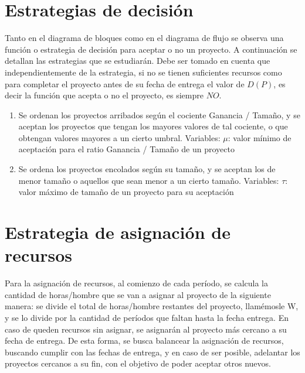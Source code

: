 \section{Estrategias de decisión}

Tanto en el diagrama de bloques como en el diagrama de flujo se observa una función o estrategia de decisión para aceptar o no un proyecto. A continuación se detallan 
las estrategias que se estudiarán. Debe ser tomado en cuenta que independientemente de la estrategia, si no se tienen suficientes recursos como para completar el proyecto 
antes de su fecha de entrega el valor de $D(P)$, es decir la función que acepta o no el proyecto, es siempre $NO$.

\begin{enumerate}
    \item Se ordenan los proyectos arribados según el cociente Ganancia / Tamaño, y se aceptan los proyectos que tengan los mayores valores de tal cociente,
 o que obtengan valores mayores a un cierto umbral.
    Variables: $\mu$: valor mínimo de aceptación para el ratio Ganancia / Tamaño de un proyecto

    \item Se ordena los proyectos encolados según su tamaño, y se aceptan los de menor tamaño o aquellos que sean menor a un cierto tamaño. 
    Variables: $\tau$: valor máximo de tamaño de un proyecto para su aceptación

\end{enumerate}

\section{Estrategia de asignación de recursos}

Para la asignación de recursos, al comienzo de cada período, se calcula la cantidad de horas/hombre que se van a asignar al proyecto de la siguiente manera: 
se divide el total de horas/hombre restantes del proyecto, llamémosle W, y se lo divide por la 
cantidad de períodos que faltan hasta la fecha entrega. En caso de queden recursos sin asignar, se asignarán al proyecto más cercano a su fecha de entrega. 
De esta forma, se busca balancear la asignación de recursos, buscando cumplir con las fechas de entrega, y en caso de ser posible, adelantar los proyectos 
cercanos a su fin, con el objetivo de poder aceptar otros nuevos.
